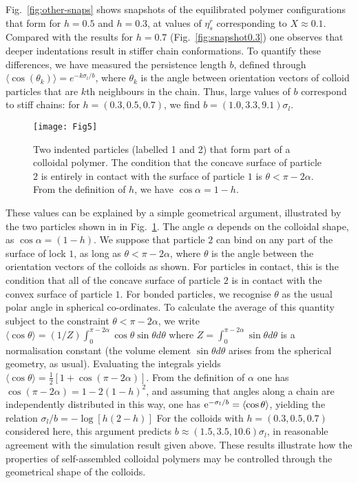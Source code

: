 \documentclass[10pt,onside,singlecolumn]{article}
\begin{document}
Fig.~\ref{fig:other-snaps} shows snapshots of the equilibrated polymer
configurations that form for $h=0.5$ and $h=0.3$, at values of
$\eta_s^r$ corresponding to $X\approx 0.1$. Compared with the results
for $h=0.7$ (Fig.~\ref{fig:snapshot0.3}) one observes that deeper
indentations result in stiffer chain conformations. To quantify these
differences, we have measured the persistence length $b$, defined
through $\langle \cos(\theta_k)\rangle=e^{-k\sigma_l/b}$, where $\theta_k$ is
the angle between orientation vectors of colloid particles that are
$k$th neighbours in the chain. Thus, large values of $b$ correspond to
stiff chains: for $h=(0.3,0.5,0.7)$, we find
$b=(1.0,3.3,9.1)\sigma_l$. 


\begin{figure} 
\texttt{[image: Fig5]}
  \caption{Two indented particles (labelled 1 and 2) that form part of a colloidal polymer.
  The condition that the concave surface of particle $2$ is entirely in contact with the surface
  of particle $1$ is $\theta < \pi-2\alpha$.  From the definition of $h$, we have $\cos\alpha = 1-h$.
  }
  \label{fig:persist}
\end{figure}

\vspace{6pt}

These values can be explained by 
a simple geometrical argument, illustrated by the two particles shown in
in Fig.~\ref{fig:persist}.  The angle $\alpha$ depends on the colloidal shape, as $\cos\alpha = (1-h)$.
 We suppose that particle $2$ can bind on any part of the surface of 
lock $1$, as long as $\theta < \pi-2\alpha$, where $\theta$ is the angle between the orientation vectors 
of the colloids as shown.  For particles in contact, this is the condition that all of the concave
surface of particle $2$ is in contact with the convex surface of particle $1$.
%
For bonded particles, we recognise $\theta$ as the usual polar angle
in spherical co-ordinates.  To calculate the average of this quantity
subject to the constraint $\theta<\pi-2\alpha$, we write
  $\langle \cos \theta \rangle = (1/Z) \int_0^{\pi-2\alpha} \cos\theta \sin\theta d\theta$
where 
  $Z = \int_0^{\pi-2\alpha} \sin\theta d\theta$ is a normalisation constant
(the volume element $\sin\theta d\theta$ arises from the spherical geometry, as usual).  
Evaluating the integrals yields $\langle\cos\theta\rangle = \frac12[1+\cos(\pi - 2\alpha)]$.
%
From the definition of $\alpha$ one has $\cos(\pi-2\alpha) = 1-2(1-h)^2$, and assuming that angles 
along a chain are independently distributed in this way,
one has ${\rm e}^{-\sigma_l/b} = \langle \cos\theta \rangle $, yielding the relation $\sigma_l/b = -\log[h(2-h)]$
For the colloids with
$h=(0.3,0.5,0.7)$ considered here, this argument predicts $b\approx(1.5,3.5,10.6)\sigma_l$, 
in reasonable agreement with the simulation result given above.
These results illustrate how the
properties of self-assembled colloidal polymers may be controlled
through the geometrical shape of the colloids.
\end{document}
